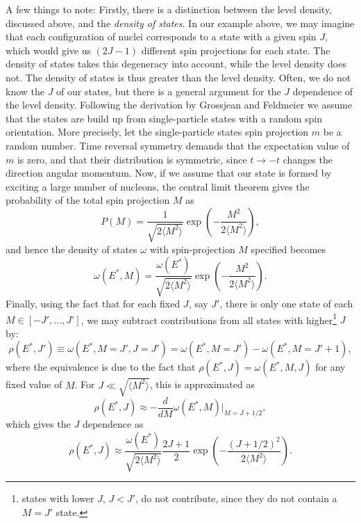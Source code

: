 A few things to note:
Firstly, there is a distinction between the level density, discussed above, and the \emph{density of states}. In our example above, we may imagine that each configuration of nuclei corresponds to a state with a given spin $J$, which would give us $(2J-1)$ different spin projections for each state. The density of states takes this degeneracy into account, while the level density does not. The density of states is thus greater than the level density.
Often, we do not know the $J$ of our states, but there is a general argument for the $J$ dependence of the level density.
Following the derivation by Grossjean and Feldmeier\cite{grossjean1985} we assume that the states are build up from single-particle states with a random spin orientation. More precisely, let the single-particle states spin projection $m$ be a random number. Time reversal symmetry demands that the expectation value of $m$ is zero, and that their distribution is symmetric, since $t\to -t$ changes the direction angular momentum. Now, if we assume that our state is formed by exciting a large number of nucleons, the central limit theorem gives the probability of the total spin projection $M$ as
\begin{equation}
P(M) = \frac{1}{\sqrt{2\langle M^2\rangle}} \exp{\left(-\frac{M^2}{2\langle M^2\rangle}\right)},
\end{equation}
and hence the density of states $\omega$ with spin-projection $M$ specified becomes
\begin{equation}
\omega(E^*,M) =  \frac{\omega(E^*)}{\sqrt{2\langle M^2\rangle}} \exp{\left(-\frac{M^2}{2\langle M^2\rangle}\right)}.
\end{equation}
Finally, using the fact that for each fixed $J$, say $J'$, there is only one state of each $M \in [-J',\dots,J']$, we may subtract contributions from all states with higher\footnote{states with lower $J$, $J<J'$, do not contribute, since they do not contain a $M=J'$ state.} $J$ by:
\begin{equation}
\rho(E^*,J') \equiv \omega(E^*,M=J',J=J') = \omega(E^*,M=J')  -\omega(E^*,M=J'+1),
\end{equation}
where the equivalence is due to the fact that $\rho(E^*,J) = \omega(E^*,M, J)$ for any fixed value of $M$. For $J\ll \sqrt{\langle M^2 \rangle}$, this is approximated as
\begin{equation}
\rho(E^*,J) \approx - \frac{d}{dM} \omega(E^*,M)\big|_{M=J+1/2},\label{eq:odm}
\end{equation}
which gives the $J$ dependence as
\begin{equation}
\rho(E^*,J) \approx \frac{\omega(E^*)}{\sqrt{2\langle M^2\rangle}} \frac{2J+1}{2} \exp{\left(-\frac{(J+1/2)^2}{2\langle M^2\rangle}\right)}.\label{eq:rhoj}
\end{equation}

